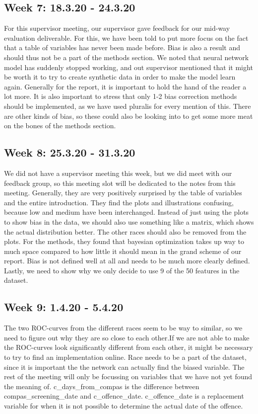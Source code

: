 \documentclass[11pt, fleqn]{article}
\begin{document}
\subsection*{Week 7: 18.3.20 - 24.3.20}
For this supervisor meeting, our supervisor gave feedback for our mid-way evaluation deliverable. For this, we have been told to put more focus on the fact that a table of variables has never been made before. Bias is also a result and should thus not be a part of the methods section. We noted that neural network model has suddenly stopped working, and out supervisor mentioned that it might be worth it to try to create synthetic data in order to make the model learn again. Generally for the report, it is important to hold the hand of the reader a lot more. It is also important to stress that only 1-2 bias correction methods should be implemented, as we have used pluralis for every mention of this. There are other kinds of bias, so these could also be looking into to get some more meat on the bones of the methods section.

\subsection*{Week 8: 25.3.20 - 31.3.20}
We did not have a supervisor meeting this week, but we did meet with our feedback group, so this meeting slot will be dedicated to the notes from this meeting. Generally, they are very positively surprised by the table of variables and the entire introduction. They find the plots and illustrations confusing, because low and medium have been interchanged. Instead of just using the plots to show bias in the data, we should also use something like a matrix, which shows the actual distribution better. The other races should also be removed from the plots. For the methods, they found that bayesian optimization takes up way to much space compared to how little it should mean in the grand scheme of our report. Bias is not defined well at all and needs to be much more clearly defined. Lastly, we need to show why we only decide to use 9 of the 50 features in the dataset.

\subsection*{Week 9: 1.4.20 - 5.4.20}
The two ROC-curves from the different races seem to be way to similar, so we need to figure out why they are so close to each other.If we are not able to make the ROC-curves look significantly different from each other, it might be necessary to try to find an implementation online. Race needs to be a part of the dataset, since it is important the the network can actually find the biased variable. The rest of the meeting will only be focussing on variables that we have not yet found the meaning of. c\_days\_from\_compas is the difference between compas\_screening\_date and c\_offence\_date. c\_offence\_date is a replacement variable for when it is not possible to determine the actual date of the offence.
\end{document}
